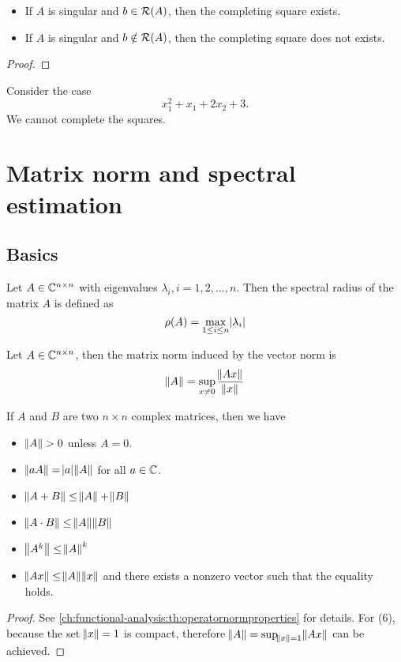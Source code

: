 \begin{refsection}
\begin{theorem}
\begin{itemize}
		\item If $A$ is singular and $b\in \mathcal{R}(A)$, then the completing square exists. 
		\item If $A$ is singular and $b\notin \mathcal{R}(A)$, then the completing square does not exists. 
	\end{itemize}
\end{theorem}
\begin{proof}

\end{proof}

\begin{example}
	Consider the case 
	$$x_1^2 + x_1 + 2x_2 +3.$$
	We cannot complete the squares. 
\end{example}


\section{Matrix norm and spectral estimation}
\subsection{Basics}
\begin{definition}\cite[8]{varga2009matrix}
Let $A \in \mathbb{C}^{n\times n}$ with eigenvalues $\lambda_i,i=1,2,...,n$. Then the spectral radius of the matrix $A$ is defined as
$$\rho(A) = \max_{1\leq i\leq n} \abs{\lambda_i}$$
\end{definition}

\begin{definition}
	Let $A\in \mathbb{C}^{n\times n}$, then the matrix norm induced by the vector norm is 
	$$\norm{A} = \sup_{x\neq 0} \frac{\norm{Ax}}{\norm{x}}$$
\end{definition}

\begin{theorem}\cite[9]{varga2009matrix}\label{ch:linearalgebra:th:propertiesMatrixNorm}
If $A$ and $B$ are two $n\times n$ complex matrices, then we have
\begin{itemize}
	\item $\norm{A}>0$ unless $A = 0$.
	\item $\norm{aA} = \abs{a}\norm{A}$ for all $a\in \mathbb{C}$.
	\item $\norm{A + B} \leq \norm{A}+ \norm{B} $
	\item $\norm{A\cdot B} \leq \norm{A}\norm{B}$
	\item $\norm{A^k} \leq \norm{A}^k$
	\item $\norm{Ax}\leq \norm{A}\norm{x}$ and there exists a nonzero vector such that the equality holds.
\end{itemize}
\end{theorem}
\begin{proof}
See \autoref{ch:functional-analysis:th:operatornormproperties} for details. For (6), because the set $\norm{x}=1$ is compact, therefore $\norm{A} = \sup_{\norm{x}=1} \norm{Ax}$ can be achieved.
\end{proof}


\end{refsection}
